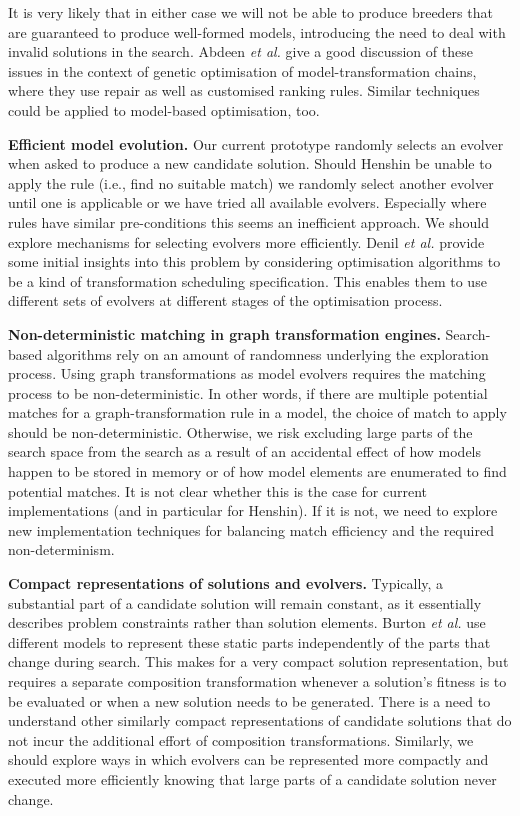 			It is very likely that in either case we will not be able to produce breeders that are guaranteed to produce well-formed models, introducing the need to
			deal with invalid solutions in the search. Abdeen \emph{et al.} \cite{Abdeen+14} give a good discussion of these issues in the context of genetic
			optimisation of model-transformation chains, where they use repair as well as customised ranking rules. Similar techniques could be applied to model-based
			optimisation, too.
			
		\textbf{Efficient model evolution.} 
			Our current prototype randomly selects an evolver when asked to produce a new candidate solution. Should Henshin be unable to apply the rule (i.e., find no
			suitable match) we randomly select another evolver until one is applicable or we have tried all available evolvers. Especially where rules have similar 
			pre-conditions this seems an inefficient approach. We should explore mechanisms for selecting evolvers more efficiently. Denil \emph{et al.} \cite{Denil+14}
			provide some initial insights into this problem by considering optimisation algorithms to be a kind of transformation scheduling specification. This enables
			them to use different sets of evolvers at different stages of the optimisation process.
			
		\textbf{Non-deterministic matching in graph transformation engines.} 
			Search-based algorithms rely on an amount of randomness underlying the exploration process. Using graph transformations as model evolvers requires the
			matching process to be non-deterministic. In other words, if there are multiple potential matches for a graph-transformation rule in a model, the choice of
			match to apply should be non-deterministic. Otherwise, we risk excluding large parts of the search space from the search as a result of an accidental effect
			of how models happen to be stored in memory or of how model elements are enumerated to find potential matches. It is not clear whether this is the case for
			current implementations (and in particular for Henshin). If it is not, we need to explore new implementation techniques for balancing match efficiency and
			the required non-determinism.
			
		\textbf{Compact representations of solutions and evolvers.} 
			Typically, a substantial part of a candidate solution will remain constant, as it essentially describes problem constraints rather than solution elements.
			Burton \emph{et al.} \cite{Burton+12} use different models to represent these static parts independently of the parts that change during search. This makes
			for a very compact solution representation, but requires a separate composition transformation whenever a solution's fitness is to be evaluated or when a
			new solution needs to be generated. There is a need to understand other similarly compact representations of candidate solutions that do not incur the
			additional effort of composition transformations. Similarly, we should explore ways in which evolvers can be represented more compactly and executed more
			efficiently knowing that large parts of a candidate solution never change.
		
